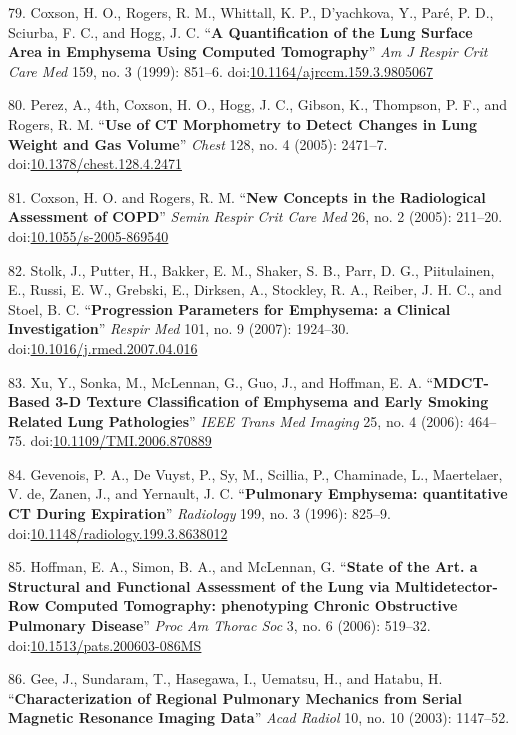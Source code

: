 \documentclass[11pt,]{article}
\begin{document}
79. Coxson, H. O., Rogers, R. M., Whittall, K. P., D'yachkova, Y.,
Par{é}, P. D., Sciurba, F. C., and Hogg, J. C. ``\textbf{A
Quantification of the Lung Surface Area in Emphysema Using Computed
Tomography}'' \emph{Am J Respir Crit Care Med} 159, no. 3 (1999):
851--6.
doi:\href{http://dx.doi.org/10.1164/ajrccm.159.3.9805067}{10.1164/ajrccm.159.3.9805067}

80. Perez, A., 4th, Coxson, H. O., Hogg, J. C., Gibson, K., Thompson, P.
F., and Rogers, R. M. ``\textbf{Use of CT Morphometry to Detect Changes
in Lung Weight and Gas Volume}'' \emph{Chest} 128, no. 4 (2005):
2471--7.
doi:\href{http://dx.doi.org/10.1378/chest.128.4.2471}{10.1378/chest.128.4.2471}

81. Coxson, H. O. and Rogers, R. M. ``\textbf{New Concepts in the
Radiological Assessment of COPD}'' \emph{Semin Respir Crit Care Med} 26,
no. 2 (2005): 211--20.
doi:\href{http://dx.doi.org/10.1055/s-2005-869540}{10.1055/s-2005-869540}

82. Stolk, J., Putter, H., Bakker, E. M., Shaker, S. B., Parr, D. G.,
Piitulainen, E., Russi, E. W., Grebski, E., Dirksen, A., Stockley, R.
A., Reiber, J. H. C., and Stoel, B. C. ``\textbf{Progression Parameters
for Emphysema: a Clinical Investigation}'' \emph{Respir Med} 101, no. 9
(2007): 1924--30.
doi:\href{http://dx.doi.org/10.1016/j.rmed.2007.04.016}{10.1016/j.rmed.2007.04.016}

83. Xu, Y., Sonka, M., McLennan, G., Guo, J., and Hoffman, E. A.
``\textbf{MDCT-Based 3-D Texture Classification of Emphysema and Early
Smoking Related Lung Pathologies}'' \emph{IEEE Trans Med Imaging} 25,
no. 4 (2006): 464--75.
doi:\href{http://dx.doi.org/10.1109/TMI.2006.870889}{10.1109/TMI.2006.870889}

84. Gevenois, P. A., De Vuyst, P., Sy, M., Scillia, P., Chaminade, L.,
Maertelaer, V. de, Zanen, J., and Yernault, J. C. ``\textbf{Pulmonary
Emphysema: quantitative CT During Expiration}'' \emph{Radiology} 199,
no. 3 (1996): 825--9.
doi:\href{http://dx.doi.org/10.1148/radiology.199.3.8638012}{10.1148/radiology.199.3.8638012}

85. Hoffman, E. A., Simon, B. A., and McLennan, G. ``\textbf{State of
the Art. a Structural and Functional Assessment of the Lung via
Multidetector-Row Computed Tomography: phenotyping Chronic Obstructive
Pulmonary Disease}'' \emph{Proc Am Thorac Soc} 3, no. 6 (2006): 519--32.
doi:\href{http://dx.doi.org/10.1513/pats.200603-086MS}{10.1513/pats.200603-086MS}

86. Gee, J., Sundaram, T., Hasegawa, I., Uematsu, H., and Hatabu, H.
``\textbf{Characterization of Regional Pulmonary Mechanics from Serial
Magnetic Resonance Imaging Data}'' \emph{Acad Radiol} 10, no. 10 (2003):
1147--52.
\end{document}
